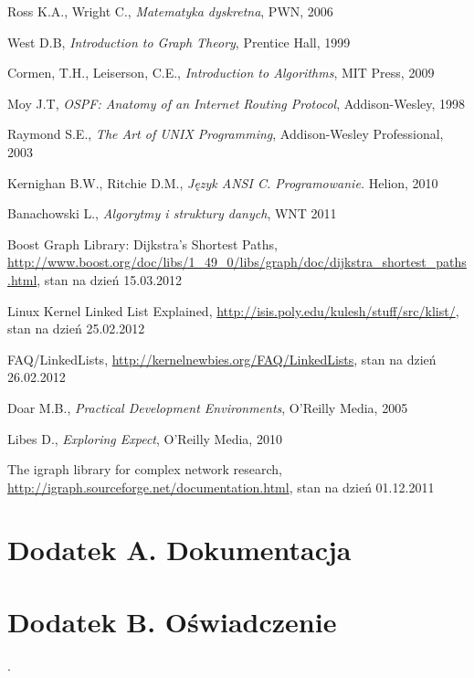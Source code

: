 \documentclass[a4paper,12pt,polish,oneside,openright]{thesis}
\begin{document}
\begin{thebibliography}{19}
Ross K.A., Wright C., \emph{Matematyka dyskretna}, PWN, 2006

West D.B, \emph{Introduction to Graph Theory}, Prentice Hall, 1999

Cormen, T.H., Leiserson, C.E., \emph{Introduction to Algorithms}, MIT Press, 2009

Moy J.T, \emph{OSPF: Anatomy of an Internet Routing Protocol}, Addison-Wesley, 1998

Raymond S.E., \emph{The Art of UNIX Programming}, Addison-Wesley Professional, 2003

Kernighan B.W., Ritchie D.M., \emph{Język ANSI C. Programowanie.} Helion, 2010

Banachowski L., \emph{Algorytmy i struktury danych}, WNT 2011

Boost Graph Library: Dijkstra's Shortest Paths, \url{http://www.boost.org/doc/libs/1_49_0/libs/graph/doc/dijkstra_shortest_paths.html}, stan na dzień 15.03.2012

Linux Kernel Linked List Explained, \url{http://isis.poly.edu/kulesh/stuff/src/klist/}, stan na dzień 25.02.2012

FAQ/LinkedLists, \url{http://kernelnewbies.org/FAQ/LinkedLists}, stan na dzień 26.02.2012

Doar M.B., \emph{Practical Development Environments}, O'Reilly Media, 2005

Libes D., \emph{Exploring Expect}, O'Reilly Media, 2010

The igraph library for complex network research, \url{http://igraph.sourceforge.net/documentation.html}, stan na dzień 01.12.2011

\end{thebibliography}



\chapter*{Dodatek A. Dokumentacja}

\chapter*{Dodatek B. Oświadczenie}
\newlength{\oldparskip}
\setlength{\oldparskip}{\parskip}
\setlength{\parindent}{0pt}.
\setlength{\parskip}{0.3cm}
\end{document}
